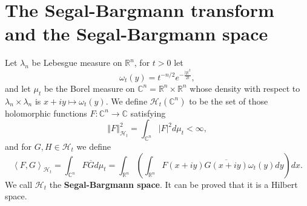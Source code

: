 \documentclass{article}
\newcommand{\inner}[2]{\left\langle #1, #2 \right\rangle}
\newcommand{\norm}[1]{\left\Vert #1 \right\Vert}
\theoremstyle{definition}
\begin{document}
\section{The Segal-Bargmann transform and the Segal-Bargmann space}
Let $\lambda_n$ be Lebesgue measure on $\mathbb{R}^n$,  
for $t>0$
let
\[
\omega_t(y) = t^{-n/2} e^{-\frac{|y|^2}{2t}},
\]
and
let $\mu_t$ be the Borel measure on $\mathbb{C}^n=\mathbb{R}^n \times \mathbb{R}^n$ whose density with respect to $\lambda_n \times \lambda_n$ is
$x+iy \mapsto \omega_t(y)$. 
We define $\mathcal{H}_t(\mathbb{C}^n)$ to be the set of those holomorphic functions $F:\mathbb{C}^n \to \mathbb{C}$ satisfying
\[
\norm{F}_{\mathcal{H}_t}^2 = \int_{\mathbb{C}^n} |F|^2 d\mu_t<\infty,
\]
and for $G,H \in \mathcal{H}_t$ we define
\[
\inner{F}{G}_{\mathcal{H}_t} = \int_{\mathbb{C}^n} F \overline{G} d\mu_t
=\int_{\mathbb{R}^n} \left( \int_{\mathbb{R}^n} F(x+iy) \overline{G(x+iy)} \omega_t(y) dy \right) dx.
\]
We call $\mathcal{H}_t$ the \textbf{Segal-Bargmann space}. It can be proved that it is a Hilbert space.
\end{document}

